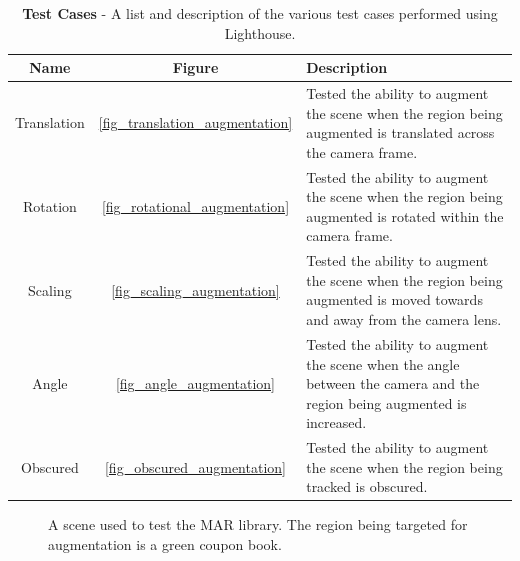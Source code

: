 \documentclass[oneside,11pt]{Latex/Classes/PhDthesisPSnPDF}
\begin{document}
\begin{table}[h!]
\centering
\begin{tabular}{| c | c | p{8cm} |} 
\hline
{\bf Name} & {\bf Figure} & {\bf Description} \\ \hline
Translation & \ref{fig_translation_augmentation} & Tested the ability to augment the scene when the region being augmented is translated across the camera frame. \\ \hline
Rotation & \ref{fig_rotational_augmentation} & Tested the ability to augment the scene when the region being augmented is rotated within the camera frame. \\ \hline
Scaling & \ref{fig_scaling_augmentation} & Tested the ability to augment the scene when the region being augmented is moved towards and away from the camera lens. \\ \hline
Angle & \ref{fig_angle_augmentation} & Tested the ability to augment the scene when the angle between the camera and the region being augmented is increased. \\ \hline
Obscured & \ref{fig_obscured_augmentation} & Tested the ability to augment the scene when the region being tracked is obscured. \\ \hline
\end{tabular}
\caption[Test Cases]{\textbf{Test Cases} - A list and description of the various test cases performed using Lighthouse.}
\label{table_test_cases}
\end{table}

\begin{figure}[h!]
  \caption{\label{fig_test_scene} A scene used to test the MAR library.  The region being targeted for augmentation is a green coupon book.}
\end{figure}
\end{document}
